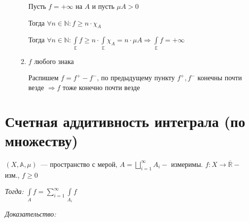\documentclass[paper=a4, fontsize=17pt]{article}
\begin{document}
\begin{enumerate}
\begin{enumerate}
		Пусть $f = +\infty$ на $A$ и пусть $\mu A > 0$

		Тогда $\forall n \in \mathds{N}: f \geqslant n \cdot \chi_A$

		Тогда $\forall n \in \mathds{N}: \int\limits_{\mathds{E}} f \geqslant n \cdot \int\limits_{\mathds{E}} \chi_A = n \cdot \mu A \Rightarrow \int\limits_{\mathds{E}} f = + \infty$

		\item $f$ любого знака

		Распишем $f = f^+ - f^-$, по предыдущему пункту $f^+, f^-$ конечны почти везде $\Rightarrow f$ тоже конечно почти везде
	\end{enumerate}

\end{enumerate}

\section{Счетная аддитивность интеграла (по множеству)}
$(X,\mathds{A},\mu)$~--- пространство с мерой, $A = \bigsqcup\limits_{i=1}^{\infty}A_{i} -$ измеримы. $f: X \rightarrow \mathbb{\overline{R}} - $ изм., $f \geqslant 0$

\emph{Тогда:} ${\displaystyle \int\limits_{A}f = \sum\limits_{i=1}^{\infty} \int\limits_{A_{i}}f}$

\emph{Доказательство:}
\end{document}
